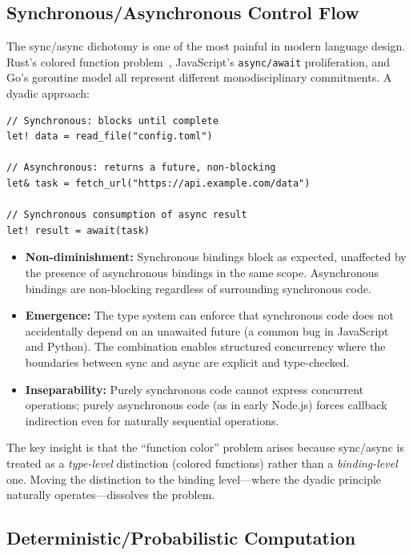 \documentclass[11pt,a4paper]{article}
\begin{document}
\subsection{Synchronous/Asynchronous Control Flow}

The sync/async dichotomy is one of the most painful in modern language design.
Rust's colored function problem~\citep{nystrom2015colored}, JavaScript's
\lstinline{async/await} proliferation, and Go's goroutine model all represent
different monodisciplinary commitments. A dyadic approach:

\begin{lstlisting}[language=Ephapax, caption={Hypothetical sync/async dyadic bindings.}]
// Synchronous: blocks until complete
let! data = read_file("config.toml")

// Asynchronous: returns a future, non-blocking
let& task = fetch_url("https://api.example.com/data")

// Synchronous consumption of async result
let! result = await(task)
\end{lstlisting}

\begin{itemize}
  \item \textbf{Non-diminishment:} Synchronous bindings block as expected,
    unaffected by the presence of asynchronous bindings in the same scope.
    Asynchronous bindings are non-blocking regardless of surrounding synchronous
    code.
  \item \textbf{Emergence:} The type system can enforce that synchronous code
    does not accidentally depend on an unawaited future (a common bug in
    JavaScript and Python). The combination enables structured concurrency
    where the boundaries between sync and async are explicit and
    type-checked.
  \item \textbf{Inseparability:} Purely synchronous code cannot express
    concurrent operations; purely asynchronous code (as in early Node.js)
    forces callback indirection even for naturally sequential operations.
\end{itemize}

The key insight is that the ``function color'' problem arises because
sync/async is treated as a \emph{type-level} distinction (colored functions)
rather than a \emph{binding-level} one. Moving the distinction to the binding
level---where the dyadic principle naturally operates---dissolves the problem.

\subsection{Deterministic/Probabilistic Computation}
\end{document}
